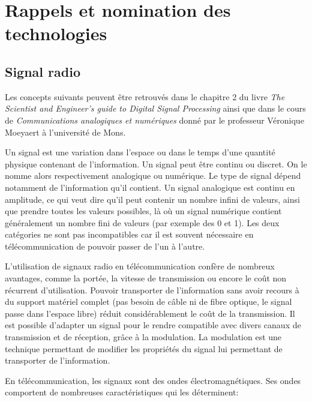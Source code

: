 \renewcommand{\leftmark}{NOMINATION DES TECHNOLOGIES}


\chapter{Rappels et nomination des technologies}\label{chap1}

\section{Signal radio}

Les concepts suivants peuvent être retrouvés dans le chapitre 2 du livre \textit{The Scientist and Engineer's guide to Digital Signal Processing} \cite{book2} ainsi que dans le cours de \textit{Communications analogiques et numériques} donné par le professeur Véronique Moeyaert à l'université de Mons.

\vspace{0.1cm}

Un signal est une variation dans l'espace ou dans le temps d'une quantité physique contenant de l'information. Un signal peut être continu ou discret. On le nomme alors respectivement analogique ou numérique. Le type de signal dépend notamment de l'information qu'il contient. Un signal analogique est continu en amplitude, ce qui veut dire qu'il peut contenir un nombre infini de valeurs, ainsi que prendre toutes les valeurs possibles, là où un signal numérique contient généra\-lement un nombre fini de valeurs (par exemple des 0 et 1).
Les deux catégories ne sont pas incompatibles car il est souvent nécessaire en télécommunication de pouvoir passer de l'un à l'autre.

\vspace{0.1cm}

L'utilisation de signaux radio en télécommunication confère de nombreux avantages, comme la portée, la vitesse de transmission  ou encore le coût non récurrent d'utilisation. Pouvoir transporter de l'information sans avoir recours à du support matériel complet (pas besoin de câble ni de fibre optique, le signal passe dans l'espace libre) réduit considérablement le coût de la transmission. Il est possible d'adapter un signal pour le rendre compatible avec divers canaux de transmission et de réception, grâce à la modulation. La modulation est une technique permettant de modifier les propriétés du signal lui permettant de transporter de l'information.

\newpage

En télécommunication, les signaux sont des ondes électromagnétiques. Ses ondes comportent de nombreuses caractéristiques qui les déterminent: 

